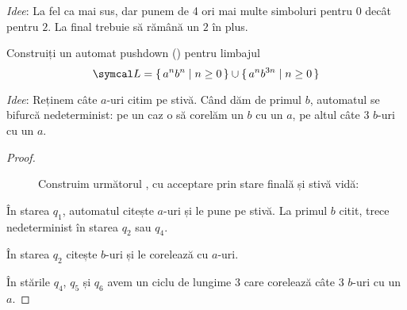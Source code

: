 \textit{Idee}: La fel ca mai sus, dar punem de 4 ori mai multe simboluri pentru \(0\) decât pentru \(2\). La final trebuie să rămână un \(2\) în plus.

\begin{exercise}
    Construiți un automat pushdown (\pda{}) pentru limbajul
    \[
        \limbaj = \set{ a^n b^n | n \geq 0 } \cup \set{ a^n b^{3n} | n \geq 0 }
    \]
\end{exercise}

\textit{Idee}: Reținem câte \(a\)-uri citim pe stivă. Când dăm de primul \(b\), automatul se bifurcă nedeterminist: pe un caz o să corelăm un \(b\) cu un \(a\), pe altul câte 3 \(b\)-uri cu un \(a\).

\begin{proof}~
    \begin{figure}[H]
        \centering
        \caption*{Construim următorul \pda{}, cu acceptare prin stare finală și stivă vidă:}
    \end{figure}

    În starea \(q_1\), automatul citește \(a\)-uri și le pune pe stivă. La primul \(b\) citit, trece nedeterminist în starea \(q_2\) sau \(q_4\).

    În starea \(q_2\) citește \(b\)-uri și le corelează cu \(a\)-uri.

    În stările \(q_4\), \(q_5\) și \(q_6\) avem un ciclu de lungime 3 care corelează câte 3 \(b\)-uri cu un \(a\).
\end{proof}

